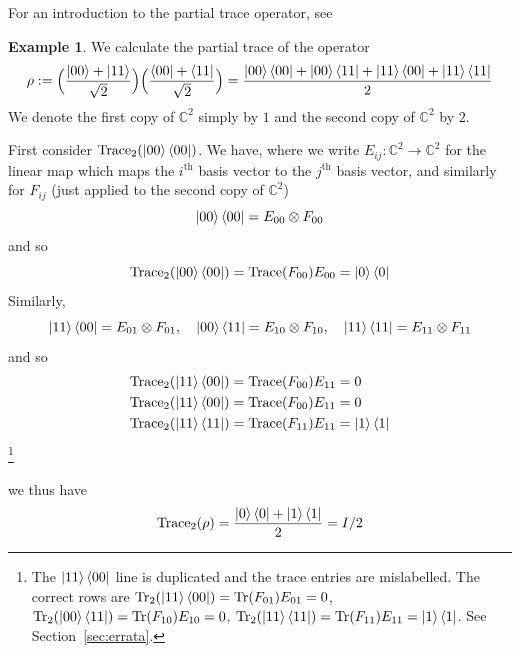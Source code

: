 \documentclass[12pt]{article}
\theoremstyle{plain}
\theoremstyle{definition}
\newtheorem{example}[thm]{Example}
\newcommand{\bb}[1]{\mathbb{#1}}
\newcommand{\lto}{\longrightarrow}
\begin{document}
For an introduction to the partial trace operator, see \cite{CommutativeAlgebra}
\begin{example}
We calculate the partial trace of the operator
\begin{equation}
\rho := \Big(\frac{\ket{00} + \ket{11}}{\sqrt{2}}\Big)\Big(\frac{\bra{00} + \bra{11}}{\sqrt{2}}\Big) = \frac{\ket{00}\bra{00} + \ket{00}\bra{11} + \ket{11}\bra{00} + \ket{11}\bra{11}}{2}
\end{equation}
We denote the first copy of $\bb{C}^2$ simply by $1$ and the second copy of $\bb{C}^2$ by $2$.

First consider $\operatorname{Trace}_2(\ket{00}\bra{00})$. We have, where we write $E_{ij}: \bb{C}^2 \lto \bb{C}^2$ for the linear map which maps the $i^{\text{th}}$ basis vector to the $j^{\text{th}}$ basis vector, and similarly for $F_{ij}$ (just applied to the second copy of $\bb{C}^2$)
\begin{equation}
\ket{00}\bra{00} = E_{00} \otimes F_{00}
\end{equation}
and so
\begin{equation}
\operatorname{Trace}_2(\ket{00}\bra{00}) = \operatorname{Trace}(F_{00})E_{00} = \ket{0}\bra{0}
\end{equation}
Similarly,
\begin{equation}
\ket{11}\bra{00} = E_{01}\otimes F_{01},\quad \ket{00}\bra{11} = E_{10} \otimes F_{10},\quad \ket{11}\bra{11} = E_{11} \otimes F_{11}
\end{equation}
and so
\begin{align}
\operatorname{Trace}_2(\ket{11}\bra{00}) = \operatorname{Trace}(F_{00})E_{11} &= 0\\
\operatorname{Trace}_2(\ket{11}\bra{00}) = \operatorname{Trace}(F_{00})E_{11} &= 0\\
\operatorname{Trace}_2(\ket{11}\bra{11}) = \operatorname{Trace}(F_{11})E_{11} &= \ket{1}\bra{1}
\end{align}\footnote{The $\ket{11}\bra{00}$ line is duplicated and the trace entries are mislabelled. The correct rows are $\operatorname{Tr}_2(\ket{11}\bra{00})=\operatorname{Tr}(F_{01})E_{01}=0$, $\operatorname{Tr}_2(\ket{00}\bra{11})=\operatorname{Tr}(F_{10})E_{10}=0$, $\operatorname{Tr}_2(\ket{11}\bra{11})=\operatorname{Tr}(F_{11})E_{11}=\ket{1}\bra{1}$. See Section~\ref{sec:errata}.}
\end{example}
we thus have
\begin{equation}
\operatorname{Trace}_2(\rho) = \frac{\ket{0}\bra{0} + \ket{1}\bra{1}}{2} = I/2
\end{equation}
\end{document}
